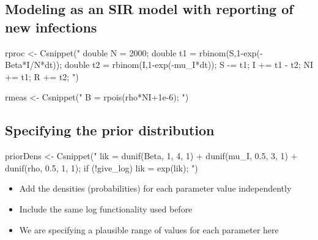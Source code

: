 \documentclass[
  letterpaper,
  DIV=11,
  numbers=noendperiod]{scrartcl}
\newenvironment{Shaded}{\begin{snugshade}}{\end{snugshade}}
\newcommand{\FunctionTok}[1]{\textcolor[rgb]{0.28,0.35,0.67}{#1}}
\newcommand{\NormalTok}[1]{\textcolor[rgb]{0.00,0.23,0.31}{#1}}
\newcommand{\OtherTok}[1]{\textcolor[rgb]{0.00,0.23,0.31}{#1}}
\newcommand{\StringTok}[1]{\textcolor[rgb]{0.13,0.47,0.30}{#1}}
\providecommand{\tightlist}{%
  \setlength{\itemsep}{0pt}\setlength{\parskip}{0pt}}\usepackage{longtable,booktabs,array}
\begin{document}
\hypertarget{modeling-as-an-sir-model-with-reporting-of-new-infections-1}{%
\subsection{Modeling as an SIR model with reporting of new
infections}\label{modeling-as-an-sir-model-with-reporting-of-new-infections-1}}

\begin{Shaded}
\begin{Highlighting}[]
\NormalTok{rproc }\OtherTok{\textless{}{-}} \FunctionTok{Csnippet}\NormalTok{(}\StringTok{"}
\StringTok{  double N = 2000;}
\StringTok{  double t1 = rbinom(S,1{-}exp({-}Beta*I/N*dt));}
\StringTok{  double t2 = rbinom(I,1{-}exp({-}mu\_I*dt));}
\StringTok{  S  {-}= t1;}
\StringTok{  I  += t1 {-} t2;}
\StringTok{  NI += t1;}
\StringTok{  R += t2;}
\StringTok{"}\NormalTok{)}

\NormalTok{rmeas }\OtherTok{\textless{}{-}} \FunctionTok{Csnippet}\NormalTok{(}\StringTok{"}
\StringTok{  B = rpois(rho*NI+1e{-}6);}
\StringTok{"}\NormalTok{)}
\end{Highlighting}
\end{Shaded}

\hypertarget{specifying-the-prior-distribution}{%
\subsection{Specifying the prior
distribution}\label{specifying-the-prior-distribution}}

\begin{Shaded}
\begin{Highlighting}[]
\NormalTok{priorDens }\OtherTok{\textless{}{-}} \FunctionTok{Csnippet}\NormalTok{(}\StringTok{"}
\StringTok{  lik = dunif(Beta, 1, 4, 1) +}
\StringTok{        dunif(mu\_I, 0.5, 3, 1) +}
\StringTok{        dunif(rho, 0.5, 1, 1);}
\StringTok{  if (!give\_log) lik = exp(lik);}
\StringTok{"}\NormalTok{)}
\end{Highlighting}
\end{Shaded}

\large

\begin{itemize}
\tightlist
\item
  Add the densities (probabilities) for each parameter value
  independently
\item
  Include the same log functionality used before
\item
  We are specifying a plausible range of values for each parameter here
\end{itemize}
\end{document}
